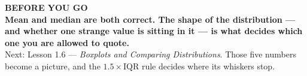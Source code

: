 \documentclass[aspectratio=169, 11pt]{beamer}
\begin{document}
{
\begin{frame}[plain]
  \vspace{1.4cm}\hspace{0.8cm}%
  \begin{minipage}{0.86\textwidth}
    {\color{goldacc}\bfseries\small BEFORE YOU GO}\\[0.7cm]
    {\color{white}\bfseries\Large Mean and median are both correct. The shape of the
    distribution --- and whether one strange value is sitting in it --- is what decides which
    one you are allowed to quote.}\\[0.8cm]
    {\color{skymid}\small Next: Lesson 1.6 --- \emph{Boxplots and Comparing Distributions}.
    Those five numbers become a picture, and the $1.5\times\text{IQR}$ rule decides where its
    whiskers stop.}
  \end{minipage}
\end{frame}
}
\end{document}
